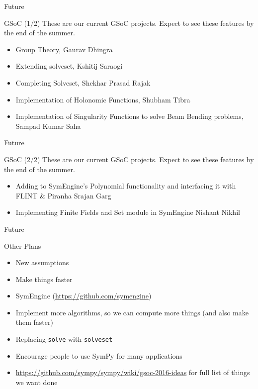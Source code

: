 \documentclass[xcolor=svgnames]{beamer}
\begin{document}
\begin{frame}{Future}
  \begin{block}{GSoC (1/2)}
    These are our current GSoC projects. Expect to see these features by the end
    of the summer.
    \begin{itemize}
    \item \normalsize Group Theory, \small Gaurav Dhingra
    \item \normalsize Extending solveset, \small Kshitij Saraogi
    \item \normalsize Completing Solveset, \small Shekhar Prasad Rajak
    \item \normalsize Implementation of Holonomic Functions, \small Shubham Tibra
    \item \normalsize Implementation of Singularity Functions to solve Beam Bending problems, \small Sampad Kumar Saha

    \end{itemize}
  \end{block}
\end{frame}

\begin{frame}{Future}
  \begin{block}{GSoC (2/2)}
    These are our current GSoC projects. Expect to see these features by the end
    of the summer.
    \begin{itemize}
    \item \normalsize Adding to SymEngine's Polynomial functionality and interfacing it with FLINT \& Piranha \small Srajan Garg
    \item \normalsize Implementing Finite Fields and Set module in SymEngine \small Nishant Nikhil
    \end{itemize}
  \end{block}
\end{frame}

\begin{frame}{Future}
\begin{block}{Other Plans}
\begin{itemize}
\item New assumptions
\item Make things faster
\item SymEngine (\url{https://github.com/symengine})
\item Implement more algorithms, so we can compute more things (and also make
  them faster)
\item Replacing \texttt{solve} with \texttt{solveset}
\item Encourage people to use SymPy for many applications
\item \url{https://github.com/sympy/sympy/wiki/gsoc-2016-ideas} for full list of
  things we want done
\end{itemize}
\end{block}
\end{frame}
\end{document}

